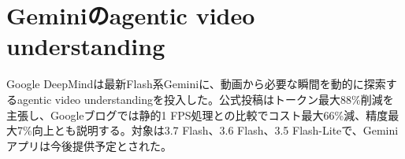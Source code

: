 \section{Geminiのagentic video understanding}
Google DeepMindは最新Flash系Geminiに、動画から必要な瞬間を動的に探索するagentic video understandingを投入した。公式投稿はトークン最大88\%削減を主張し、Googleブログでは静的1 FPS処理との比較でコスト最大66\%減、精度最大7\%向上とも説明する。対象は3.7 Flash、3.6 Flash、3.5 Flash-Liteで、Geminiアプリは今後提供予定とされた。
